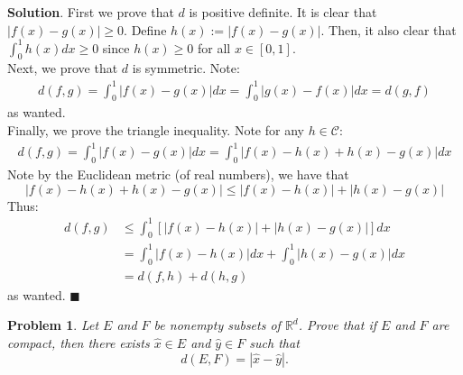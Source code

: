 \documentclass[12pt]{article}
\renewcommand{\=}[1]{\stackrel{#1}{=}} %
\newtheorem{p}{Problem}[section]
\theoremstyle{definition}
\newenvironment{s}{%
        \begin{trivlist} \item \textbf{Solution}. }{%
            \hspace*{\fill} $\blacksquare$\end{trivlist}}%
\begin{document}
\begin{s}
    First we prove that $d$ is positive definite. It is clear that $|f(x)-g(x)|\geq 0$. Define $h(x) := |f(x) - g(x)|$. Then,
    it also clear that $\int_0^1 h(x)dx\geq 0$ since $h(x)\geq 0$ for all $x\in[0,1]$.\\

    Next, we prove that $d$ is symmetric. Note:
    \begin{align*}
        d(f,g) = \int_0^1 |f(x)-g(x)|dx = \int_0^1 |g(x) - f(x)|dx = d(g,f)
    \end{align*}
    as wanted.\\

    Finally, we prove the triangle inequality. Note for any $h\in\mathcal{C}$:
    \begin{align*}
        d(f,g) = \int_0^1 |f(x)-g(x)|dx = \int_0^1 |f(x)-h(x)+h(x)-g(x)|dx
    \end{align*}
    Note by the Euclidean metric (of real numbers), we have that 
    \[ |f(x)-h(x)+h(x)-g(x)|\leq |f(x)-h(x)| + |h(x)-g(x)| \]
    Thus:
    \begin{align*}
        d(f,g) &\leq \int_0^1 [|f(x)-h(x)| + |h(x)-g(x)|]dx \\
        &= \int_0^1 |f(x)-h(x)|dx + \int_0^1 |h(x)-g(x)|dx  \\
        &= d(f,h) + d(h,g)
    \end{align*}
    as wanted.
\end{s}

\begin{p}
    Let $E$ and $F$ be nonempty subsets of $\mathbb{R}^d$. Prove that if $E$ and $F$ are compact, then there exists 
    $\hat{x}\in E$ and $\hat{y}\in F$ such that
    \[ d(E,F) = |\hat{x}-\hat{y}|. \]
\end{p}
\end{document}
